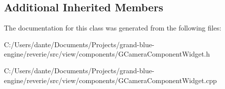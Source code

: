 \subsection*{Additional Inherited Members}


The documentation for this class was generated from the following files\+:\begin{DoxyCompactItemize}
\item 
C\+:/\+Users/dante/\+Documents/\+Projects/grand-\/blue-\/engine/reverie/src/view/components/G\+Camera\+Component\+Widget.\+h\item 
C\+:/\+Users/dante/\+Documents/\+Projects/grand-\/blue-\/engine/reverie/src/view/components/G\+Camera\+Component\+Widget.\+cpp\end{DoxyCompactItemize}
